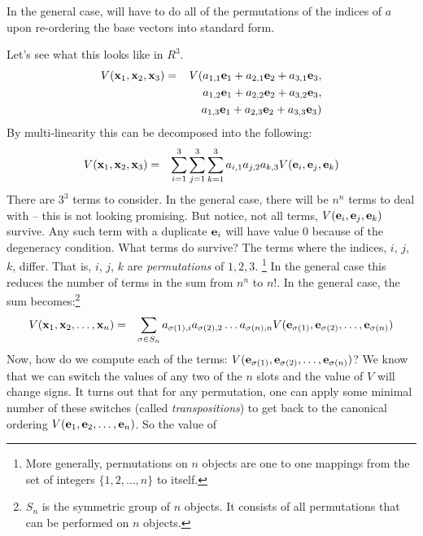 \documentclass{article}
\begin{document}
In the general case, will have to do all of the permutations of the indices of $a$
upon re-ordering the base vectors into standard form.

Let's see what this looks like in $R^3$.
\begin{eqnarray}
  V({\bf x}_1, {\bf x}_2, {\bf x}_3)
  & = & V(a_{1,1} {\bf e}_1 + a_{2,1} {\bf e}_2 + a_{3,1} {\bf e}_3, \nonumber \\
  & & \hphantom{V(}a_{1,2} {\bf e}_1 + a_{2,2} {\bf e}_2 + a_{3,2} {\bf e}_3, \nonumber \\
  & & \hphantom{V(}a_{1,3} {\bf e}_1 + a_{2,3} {\bf e}_2 + a_{3,3} {\bf e}_3)
\end{eqnarray}
By multi-linearity this can be decomposed into the following:
\begin{eqnarray}
  V({\bf x}_1, {\bf x}_2, {\bf x}_3)
  & = & \sum_{i=1}^3\sum_{j=1}^3 \sum_{k=1}^3 a_{i,1} a_{j,2} a_{k,3}
        V({\bf e}_{i}, {\bf e}_{j}, {\bf e}_{k})
\end{eqnarray}
There are $3^3$ terms to consider. In the general case, there will be $n^n$ terms to
deal with -- this is not looking promising. But notice, not all terms,
$V({\bf e}_{i}, {\bf e}_{j}, {\bf e}_{k})$ survive. Any such term with
a duplicate ${\bf e}_i$ will have value $0$ because of the degeneracy condition.
What terms do survive? The terms
where the indices, $i$, $j$, $k$, differ. That is, $i$, $j$, $k$ are
{\em permutations\/}
of $1, 2, 3$.%
\footnote{More generally, permutations on $n$ objects are one to one
  mappings from the set of integers $\{1, 2, \ldots, n\}$ to itself.}
In the general case this reduces
the number of terms in the sum from $n^n$ to $n!$. In the general case, the
sum becomes:\footnote{$S_n$ is the symmetric group of $n$ objects. It consists of 
all permutations that can be performed on $n$ objects.}
\begin{eqnarray}
  V({\bf x}_1, {\bf x}_2, \ldots, {\bf x}_n)
  & = & \sum_{\sigma \in S_n} a_{\sigma(1), i} a_{\sigma(2),2} \ldots a_{\sigma(n), n}
        V({\bf e}_{\sigma(1)}, {\bf e}_{\sigma(2)}, \ldots, {\bf e}_{\sigma(n)})
\end{eqnarray}
Now, how do we compute each of the terms:
$V({\bf e}_{\sigma(1)}, {\bf e}_{\sigma(2)}, \ldots, {\bf e}_{\sigma(n)})$?
We know that we can switch the values of any two of the $n$ slots and the
value of $V$ will change signs. It turns out that for any permutation, one can
apply some minimal number of these switches (called {\em transpositions\/})
to get back to the canonical
ordering $V({\bf e}_1, {\bf e}_2, \ldots, {\bf e}_n)$. So the value of
\end{document}
